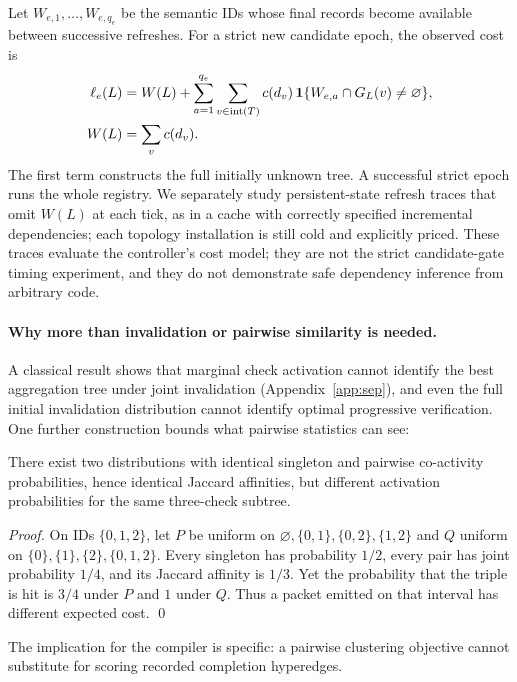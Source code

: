Let $W_{e,1},\ldots,W_{e,q_e}$ be the semantic IDs whose final records become
available between successive refreshes. For a strict new candidate epoch, the
observed cost is
\begin{align}
\ell_e(L)&=W(L)+\sum_{a=1}^{q_e}\sum_{v\in\mathrm{int}(T)}c(d_v)\,\mathbf 1\{W_{e,a}\cap G_L(v)\ne\varnothing\},\notag\\
W(L)&=\sum_{v}c(d_v).\label{eq:lcost}\end{align}
The first term constructs the full initially unknown tree. A successful strict
epoch runs the whole registry. We separately study persistent-state refresh
traces that omit $W(L)$ at each tick, as in a cache with correctly specified
incremental dependencies; each topology installation is still cold and
explicitly priced. These traces evaluate the controller's cost model; they are
not the strict candidate-gate timing experiment, and they do not demonstrate
safe dependency inference from arbitrary code.

\paragraph{Why more than invalidation or pairwise similarity is needed.}\label{sec:why}
A classical result shows that marginal check activation cannot identify the best
aggregation tree under joint invalidation (Appendix~\ref{app:sep}), and even the
full initial invalidation distribution cannot identify optimal progressive
verification. One further construction bounds what pairwise statistics can see:

\begin{proposition}\label{prop:pairwise}
There exist two distributions with identical singleton and pairwise co-activity
probabilities, hence identical Jaccard affinities, but different activation
probabilities for the same three-check subtree.
\end{proposition}
\begin{proof}
On IDs $\{0,1,2\}$, let $P$ be uniform on $\varnothing,\{0,1\},\{0,2\},\{1,2\}$
and $Q$ uniform on $\{0\},\{1\},\{2\},\{0,1,2\}$. Every singleton has
probability $1/2$, every pair has joint probability $1/4$, and its Jaccard
affinity is $1/3$. Yet the probability that the triple is hit is $3/4$ under $P$
and $1$ under $Q$. Thus a packet emitted on that interval has different expected
cost. \qed
\end{proof}
The implication for the compiler is specific: a pairwise clustering
objective cannot substitute for scoring recorded completion hyperedges.

